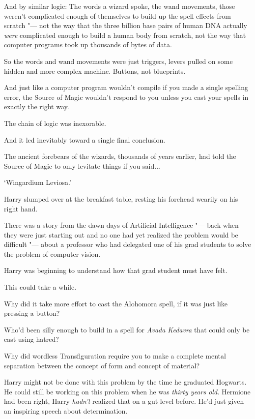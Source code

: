 And by similar logic: The words a wizard spoke, the wand movements,
those weren't complicated enough of themselves to build up the spell
effects from scratch "--- not the way that the three billion base pairs of
human DNA actually \emph{were} complicated enough to build a human body
from scratch, not the way that computer programs took up thousands of
bytes of data.

So the words and wand movements were just triggers, levers pulled on
some hidden and more complex machine. Buttons, not blueprints.

And just like a computer program wouldn't compile if you made a single
spelling error, the Source of Magic wouldn't respond to you unless you
cast your spells in exactly the right way.

The chain of logic was inexorable.

And it led inevitably toward a single final conclusion.

The ancient forebears of the wizards, thousands of years earlier, had
told the Source of Magic to only levitate things if you said...

`Wingardium Leviosa.'

Harry slumped over at the breakfast table, resting his forehead wearily
on his right hand.

There was a story from the dawn days of Artificial Intelligence "--- back
when they were just starting out and no one had yet realized the problem
would be difficult "--- about a professor who had delegated one of his grad
students to solve the problem of computer vision.

Harry was beginning to understand how that grad student must have felt.

This could take a while.

Why did it take more effort to cast the Alohomora spell, if it was just
like pressing a button?

Who'd been silly enough to build in a spell for \emph{Avada Kedavra}
that could only be cast using hatred?

Why did wordless Transfiguration require you to make a complete mental
separation between the concept of form and concept of material?

Harry might not be done with this problem by the time he graduated
Hogwarts. He could still be working on this problem when he was
\emph{thirty years old.} Hermione had been right, Harry \emph{hadn't}
realized that on a gut level before. He'd just given an inspiring speech
about determination.


